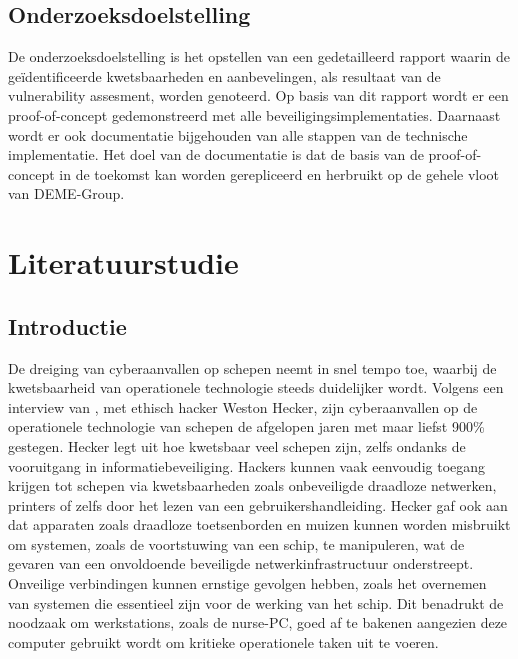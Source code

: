 \subsection{Onderzoeksdoelstelling}
De onderzoeksdoelstelling is het opstellen van een gedetailleerd rapport waarin de geïdentificeerde kwetsbaarheden en aanbevelingen, als resultaat van de vulnerability assesment, worden genoteerd.
Op basis van dit rapport wordt er een proof-of-concept gedemonstreerd met alle beveiligingsimplementaties.
Daarnaast wordt er ook documentatie bijgehouden van alle stappen van de technische implementatie.
Het doel van de documentatie is dat de basis van de proof-of-concept in de toekomst kan worden gerepliceerd en herbruikt op de gehele vloot van DEME-Group.



\section{Literatuurstudie}%
\label{sec:literatuurstudie}
\subsection{Introductie}
De dreiging van cyberaanvallen op schepen neemt in snel tempo toe, waarbij de kwetsbaarheid van operationele technologie steeds duidelijker wordt. Volgens 
een interview van \textcite{Hecker2021}, met ethisch hacker Weston Hecker, zijn cyberaanvallen op de operationele technologie van schepen de afgelopen jaren 
met maar liefst 900\% gestegen. Hecker legt uit hoe kwetsbaar veel schepen zijn, zelfs ondanks de vooruitgang in informatiebeveiliging. Hackers kunnen vaak eenvoudig 
toegang krijgen tot schepen via kwetsbaarheden zoals onbeveiligde draadloze netwerken, printers of zelfs door het lezen van een gebruikershandleiding. Hecker gaf ook aan dat apparaten zoals draadloze toetsenborden en muizen 
kunnen worden misbruikt om systemen, zoals de voortstuwing van een schip, te manipuleren, wat de gevaren van een onvoldoende beveiligde netwerkinfrastructuur onderstreept. 
Onveilige verbindingen kunnen ernstige gevolgen hebben, zoals het overnemen van systemen die essentieel zijn voor de werking van het schip.
Dit benadrukt de noodzaak om werkstations, zoals de nurse-PC, goed af te bakenen aangezien deze computer gebruikt wordt om kritieke operationele taken uit te voeren.

